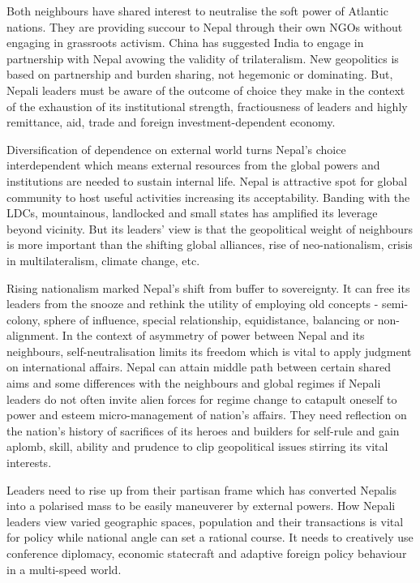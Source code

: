 \documentclass[
  openany]{book}
\begin{document}
Both neighbours have shared interest to neutralise the soft power of Atlantic nations. They are providing succour to Nepal through their own NGOs without engaging in grassroots activism. China has suggested India to engage in partnership with Nepal avowing the validity of trilateralism. New geopolitics is based on partnership and burden sharing, not hegemonic or dominating. But, Nepali leaders must be aware of the outcome of choice they make in the context of the exhaustion of its institutional strength, fractiousness of leaders and highly remittance, aid, trade and foreign investment-dependent economy.

Diversification of dependence on external world turns Nepal's choice interdependent which means external resources from the global powers and institutions are needed to sustain internal life. Nepal is attractive spot for global community to host useful activities increasing its acceptability. Banding with the LDCs, mountainous, landlocked and small states has amplified its leverage beyond vicinity. But its leaders' view is that the geopolitical weight of neighbours is more important than the shifting global alliances, rise of neo-nationalism, crisis in multilateralism, climate change, etc.

Rising nationalism marked Nepal's shift from buffer to sovereignty. It can free its leaders from the snooze and rethink the utility of employing old concepts - semi-colony, sphere of influence, special relationship, equidistance, balancing or non-alignment. In the context of asymmetry of power between Nepal and its neighbours, self-neutralisation limits its freedom which is vital to apply judgment on international affairs. Nepal can attain middle path between certain shared aims and some differences with the neighbours and global regimes if Nepali leaders do not often invite alien forces for regime change to catapult oneself to power and esteem micro-management of nation's affairs. They need reflection on the nation's history of sacrifices of its heroes and builders for self-rule and gain aplomb, skill, ability and prudence to clip geopolitical issues stirring its vital interests.

Leaders need to rise up from their partisan frame which has converted Nepalis into a polarised mass to be easily maneuverer by external powers. How Nepali leaders view varied geographic spaces, population and their transactions is vital for policy while national angle can set a rational course. It needs to creatively use conference diplomacy, economic statecraft and adaptive foreign policy behaviour in a multi-speed world.
\end{document}
